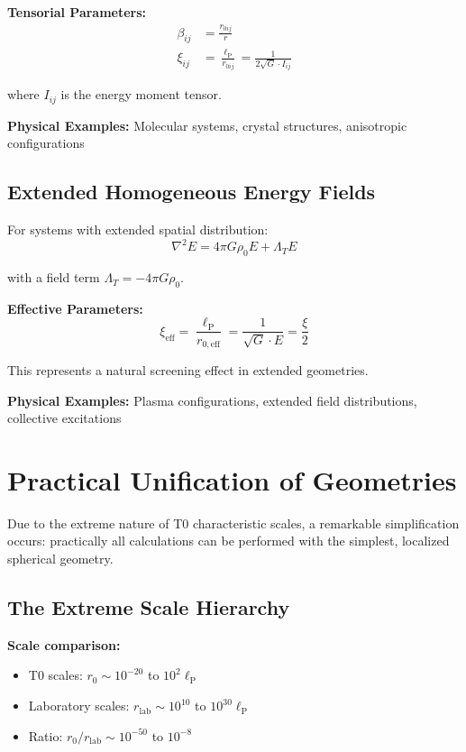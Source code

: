 \documentclass[12pt,a4paper]{report}
\newcommand{\lP}{\ell_{\text{P}}}         %
\newcommand{\Lambdat}{\Lambda_T}          %
\newcommand{\rzero}{r_0}                  %
\begin{document}
	\textbf{Tensorial Parameters:}
	\begin{align}
		\beta_{ij} &= \frac{r_{0ij}}{r} \\
		\xi_{ij} &= \frac{\lP}{r_{0ij}} = \frac{1}{2\sqrt{G} \cdot I_{ij}}
	\end{align}
	
	where $I_{ij}$ is the energy moment tensor.
	
	\textbf{Physical Examples:} Molecular systems, crystal structures, anisotropic configurations
	
	\subsection{Extended Homogeneous Energy Fields}
	\label{subsec:extended_homogeneous}
	
	For systems with extended spatial distribution:
	\begin{equation}
		\nabla^2 E = 4\pi G \rho_0 E + \Lambdat E
	\end{equation}
	
	with a field term $\Lambdat = -4\pi G \rho_0$.
	
	\textbf{Effective Parameters:}
	\begin{equation}
		\xi_{\text{eff}} = \frac{\lP}{r_{0,\text{eff}}} = \frac{1}{\sqrt{G} \cdot E} = \frac{\xi}{2}
	\end{equation}
	
	This represents a natural screening effect in extended geometries.
	
	\textbf{Physical Examples:} Plasma configurations, extended field distributions, collective excitations
	
	\section{Practical Unification of Geometries}
	\label{sec:practical_unification}
	
	Due to the extreme nature of T0 characteristic scales, a remarkable simplification occurs: practically all calculations can be performed with the simplest, localized spherical geometry.
	
	\subsection{The Extreme Scale Hierarchy}
	\label{subsec:extreme_scale_hierarchy}
	
	\textbf{Scale comparison:}
	\begin{itemize}
		\item T0 scales: $\rzero \sim 10^{-20}$ to $10^{2} \lP$
		\item Laboratory scales: $r_{\text{lab}} \sim 10^{10}$ to $10^{30} \lP$
		\item Ratio: $\rzero/r_{\text{lab}} \sim 10^{-50}$ to $10^{-8}$
	\end{itemize}
	
\end{document}
